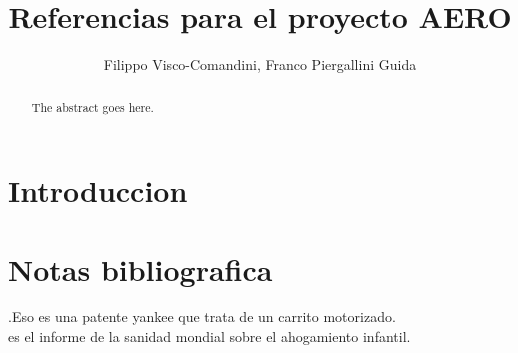 \documentclass[draft]{IEEEtran}
\begin{document}
\title{Referencias para el proyecto AERO}

\author{Filippo Visco-Comandini, Franco Piergallini Guida}%



\maketitle

\begin{abstract}
The abstract goes here.
\end{abstract}
\section{Introduccion}
\cite{nahmias2004models}

\section{Notas bibliografica}

\cite{voeks1970self}.Eso es una patente yankee que trata de un carrito motorizado.\\
\cite{OMS2018} es el informe de la sanidad mondial sobre el ahogamiento infantil.







\end{document}
